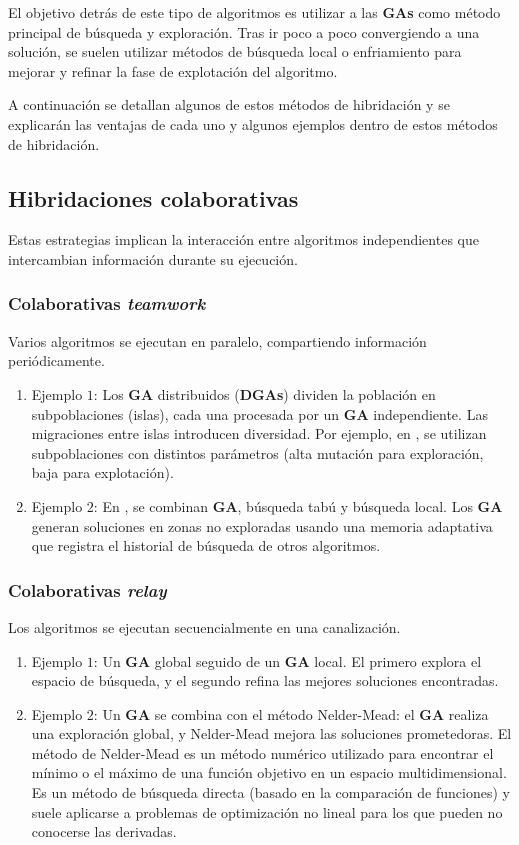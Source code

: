 \documentclass[12pt,letterpaper]{article}
\begin{document}
El objetivo detrás de este tipo de algoritmos es utilizar a las \textbf{GAs} como método principal de búsqueda y exploración. Tras ir poco a poco convergiendo a una solución, se suelen utilizar métodos de búsqueda local o enfriamiento para mejorar y refinar la fase de explotación del algoritmo.

A continuación se detallan algunos de estos métodos \cite{García-Martínez2018} de hibridación y se explicarán las ventajas de cada uno y algunos ejemplos dentro de estos métodos de hibridación.

\subsection{Hibridaciones colaborativas}
Estas estrategias implican la interacción entre algoritmos independientes que intercambian información durante su ejecución.
\subsubsection{Colaborativas \textit{teamwork}}
Varios algoritmos se ejecutan en paralelo, compartiendo información periódicamente.
\begin{enumerate}
    \item Ejemplo $1$: Los \textbf{GA} distribuidos (\textbf{DGAs}) dividen la población en subpoblaciones (islas), cada una procesada por un \textbf{GA} independiente. Las migraciones entre islas introducen diversidad. Por ejemplo, en \cite{843494}, se utilizan subpoblaciones con distintos parámetros (alta mutación para exploración, baja para explotación).
    \item Ejemplo $2$: En \cite{cosearch}, se combinan \textbf{GA}, búsqueda tabú y búsqueda local. Los \textbf{GA} generan soluciones en zonas no exploradas usando una memoria adaptativa que registra el historial de búsqueda de otros algoritmos.
\end{enumerate}

\subsubsection{Colaborativas \textit{relay}}
Los algoritmos se ejecutan secuencialmente en una canalización.
\begin{enumerate}
    \item Ejemplo $1$: Un \textbf{GA} global seguido de un \textbf{GA} local. El primero explora el espacio de búsqueda, y el segundo refina las mejores soluciones encontradas.
    \item Ejemplo $2$: Un \textbf{GA} se combina con el método Nelder-Mead: el \textbf{GA} realiza una exploración global, y Nelder-Mead mejora las soluciones prometedoras. El método de Nelder-Mead es un método numérico utilizado para encontrar el mínimo o el máximo de una función objetivo en un espacio multidimensional. Es un método de búsqueda directa (basado en la comparación de funciones) y suele aplicarse a problemas de optimización no lineal para los que pueden no conocerse las derivadas.
\end{enumerate}
\end{document}
